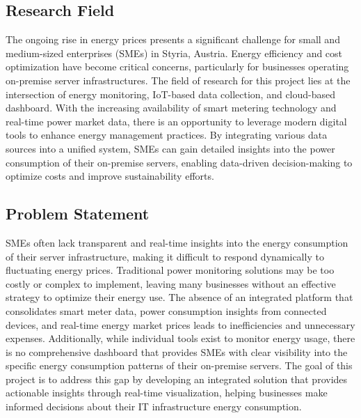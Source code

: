 \subsection{Research Field}
The ongoing rise in energy prices presents a significant challenge for small and medium-sized enterprises (SMEs) in Styria, Austria. 
Energy efficiency and cost optimization have become critical concerns, particularly for businesses operating on-premise server infrastructures. 
The field of research for this project lies at the intersection of energy monitoring, IoT-based data collection, and cloud-based dashboard. 
With the increasing availability of smart metering technology and real-time power market data, there is an opportunity to leverage modern digital tools to enhance energy management practices. 
By integrating various data sources into a unified system, SMEs can gain detailed insights into the power consumption of their on-premise servers, enabling data-driven decision-making to optimize costs and improve sustainability efforts.

\subsection{Problem Statement}

SMEs often lack transparent and real-time insights into the energy consumption of their server infrastructure, making it difficult to respond dynamically to fluctuating energy prices. 
Traditional power monitoring solutions may be too costly or complex to implement, leaving many businesses without an effective strategy to optimize their energy use. 
The absence of an integrated platform that consolidates smart meter data, power consumption insights from connected devices, and real-time energy market prices leads to inefficiencies and unnecessary expenses. 
Additionally, while individual tools exist to monitor energy usage, there is no comprehensive dashboard that provides SMEs with clear visibility into the specific energy consumption patterns of their on-premise servers. 
The goal of this project is to address this gap by developing an integrated solution that provides actionable insights through real-time visualization, helping businesses make informed decisions about their IT infrastructure energy consumption.


